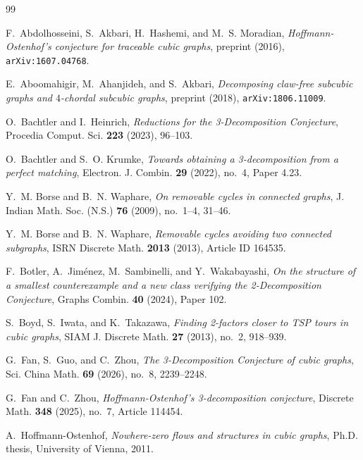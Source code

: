 \documentclass[a4paper,11pt]{article}
\numberwithin{equation}{section}
\begin{document}
\begin{thebibliography}{99}

F.~Abdolhosseini, S.~Akbari, H.~Hashemi, and M.~S. Moradian,
\emph{Hoffmann-Ostenhof's conjecture for traceable cubic graphs},
preprint (2016), \texttt{arXiv:1607.04768}.

E.~Aboomahigir, M.~Ahanjideh, and S.~Akbari,
\emph{Decomposing claw-free subcubic graphs and $4$-chordal subcubic graphs},
preprint (2018), \texttt{arXiv:1806.11009}.

O.~Bachtler and I.~Heinrich,
\emph{Reductions for the 3-Decomposition Conjecture},
Procedia Comput. Sci. \textbf{223} (2023), 96--103.

O.~Bachtler and S.~O. Krumke,
\emph{Towards obtaining a 3-decomposition from a perfect matching},
Electron. J. Combin. \textbf{29} (2022), no.~4, Paper 4.23.

Y.~M. Borse and B.~N. Waphare,
\emph{On removable cycles in connected graphs},
J. Indian Math. Soc. (N.S.) \textbf{76} (2009), no.~1--4, 31--46.

Y.~M. Borse and B.~N. Waphare,
\emph{Removable cycles avoiding two connected subgraphs},
ISRN Discrete Math. \textbf{2013} (2013), Article ID 164535.

F.~Botler, A.~Jim\'enez, M.~Sambinelli, and Y.~Wakabayashi,
\emph{On the structure of a smallest counterexample and a new class verifying
the 2-Decomposition Conjecture},
Graphs Combin. \textbf{40} (2024), Paper 102.

S.~Boyd, S.~Iwata, and K.~Takazawa,
\emph{Finding 2-factors closer to TSP tours in cubic graphs},
SIAM J. Discrete Math. \textbf{27} (2013), no.~2, 918--939.

G.~Fan, S.~Guo, and C.~Zhou,
\emph{The 3-Decomposition Conjecture of cubic graphs},
Sci. China Math. \textbf{69} (2026), no.~8, 2239--2248.

G.~Fan and C.~Zhou,
\emph{Hoffmann-Ostenhof's 3-decomposition conjecture},
Discrete Math. \textbf{348} (2025), no.~7, Article 114454.

A.~Hoffmann-Ostenhof,
\emph{Nowhere-zero flows and structures in cubic graphs},
Ph.D. thesis, University of Vienna, 2011.


\end{thebibliography}
\end{document}
